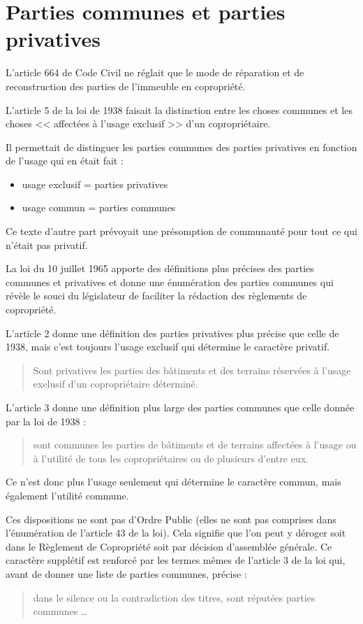 \chapter{Parties communes et parties privatives}

	L'article 664 de Code Civil ne réglait que le mode de réparation et de reconstruction des parties de
	l'immeuble en copropriété.
	
	L'article 5 de la loi de 1938 faisait la distinction entre les choses communes et les choses << affectées à
	l'usage exclusif >> d'un copropriétaire.
	
	Il permettait de distinguer les parties communes des parties privatives en fonction de l'usage qui en était
	fait :
	\begin{itemize}
		\item usage exclusif = parties privatives
		\item usage commun = parties communes
	\end{itemize}
	
	Ce texte d'autre part prévoyait une présomption de communauté pour tout ce qui n'était pas privatif.
	
	La loi du 10 juillet 1965 apporte des définitions plus précises des parties communes et privatives et donne
	une énumération des parties communes qui révèle le souci du législateur de faciliter la rédaction des
	règlements de copropriété.
	
	L'article 2 donne une définition des parties privatives plus précise que celle de 1938, mais c’est toujours
	l'usage exclusif qui détermine le caractère privatif.
	\begin{quote}
		Sont privatives les parties des bâtiments et des terrains réservées à l'usage exclusif d'un copropriétaire déterminé.
	\end{quote}

	L'article 3 donne une définition plus large des parties communes que celle donnée par la loi de 1938 :
	\begin{quote}
		sont communes les parties de bâtiments et de terrains affectées à l'usage ou à l'utilité de tous les
		copropriétaires ou de plusieurs d'entre eux. 
	\end{quote}

	Ce n'est donc plus l'usage seulement qui détermine le caractère commun, mais également l'utilité commune.
	
	Ces dispositions ne sont pas d’Ordre Public (elles ne sont pas comprises dans l'énumération de l'article 43
	de la loi). Cela signifie que l'on peut y déroger soit dans le Règlement de Copropriété soit par décision
	d'assemblée générale. Ce caractère supplétif est renforcé par les termes mêmes de l'article 3 de la loi qui,
	avant de donner une liste de parties communes, précise :
	\begin{quote}
		dans le silence ou la contradiction des titres,	sont réputées parties communes \dots
	\end{quote}
	
